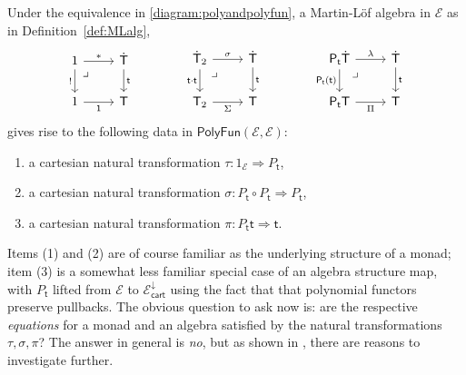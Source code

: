 \documentclass[12pt,reqno]{amsart}
\newcommand{\EE}{\ensuremath{\mathcal{E}}}
\newcommand{\alg}[1]{\ensuremath{\mathsf{#1}}}
\renewcommand{\t}{\ensuremath{\mathsf{t}}}
\newcommand{\T}{\ensuremath{\mathsf{T}}}
\newcommand{\TT}{\ensuremath{\dot{\mathsf{T}}}}
\newcommand{\pbcorner}{\arrow[dr,phantom,"\lrcorner" very near start, shift right=.5ex]} %
\theoremstyle{remark}
\theoremstyle{definition}
\begin{document}
Under the equivalence in \eqref{diagram:polyandpolyfun}, a Martin-L\"of algebra in $\EE$ as in Definition~\ref{def:MLalg},
\begin{equation}\label{diag:MLalg2}
\begin{tikzcd}
	1 \ar[r,"*"] \ar[d,swap,"!"] \pbcorner &  \TT \ar[d, "\t"]\\  
	1 \ar[r, swap,"\mathsf{1}"] & \T
 \end{tikzcd}\qquad \qquad 
 \begin{tikzcd}
	\TT_2  \ar[r,"\sigma"] \ar[d,swap,"\t\cdot\t"] \pbcorner &  \TT \ar[d, "\t"]\\  
	\T_2 \ar[r,swap, "\Sigma"] & \T
\end{tikzcd} \qquad \qquad 
	 \begin{tikzcd}
	\alg{P}_\t\TT \ar[r,"\lambda"] \ar[d,swap,"\alg{P}_\t(\t)"] \pbcorner &  \TT \ar[d, "\t"]\\  
	\alg{P}_\t\T \ar[r,swap, "\Pi"] & \T
 \end{tikzcd} 
 \end{equation}
gives rise to the following data in $\mathsf{PolyFun}(\EE, \EE)$:
\begin{enumerate}
\item a cartesian natural transformation $\tau :1_\EE \Rightarrow P_\t$,
\item a cartesian natural transformation $\sigma :P_\t\circ P_\t \Rightarrow P_\t$,
\item a cartesian natural transformation $\pi:P_\t\t \Rightarrow \t$.
\end{enumerate}
%
Items (1) and (2) are of course familiar as the underlying structure of a monad; item (3) is a somewhat less familiar special case of an algebra structure map, with $P_\t$ lifted from $\EE$ to $\EE^{\downarrow}_{\mathsf{cart}}$ using the fact that that polynomial functors preserve pullbacks.  The obvious question to ask now is: are the respective \emph{equations} for a monad and an algebra satisfied by the natural transformations $\tau, \sigma, \pi$?  The answer in general is \emph{no}, but as shown in \cite{Newstead:thesis, NA:2018}, there are reasons to investigate further.
 
\end{document}
